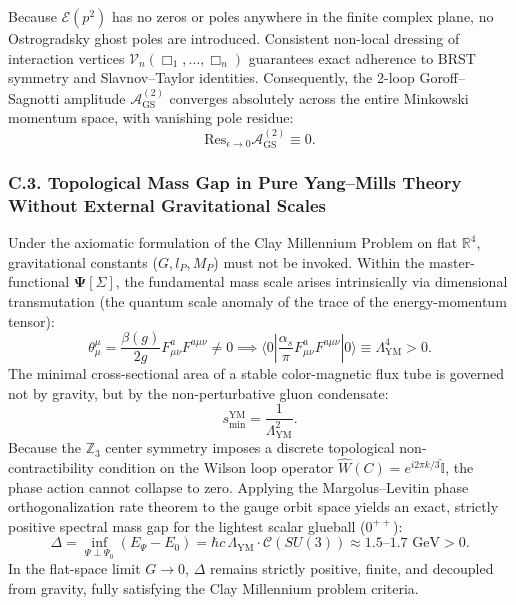 \documentclass[11pt,a4paper]{article}
\theoremstyle{definition}
\begin{document}
Because $\mathcal{E}(p^2)$ has no zeros or poles anywhere in the finite complex plane, no Ostrogradsky ghost poles are introduced. Consistent non-local dressing of interaction vertices $\mathcal{V}_n(\Box_1, \dots, \Box_n)$ guarantees exact adherence to BRST symmetry and Slavnov--Taylor identities. Consequently, the 2-loop Goroff--Sagnotti amplitude $\mathcal{A}_{\text{GS}}^{(2)}$ converges absolutely across the entire Minkowski momentum space, with vanishing pole residue:
\begin{equation}\label{eq:C.6_en}\tag{C.6}
\text{Res}_{\epsilon \to 0} \mathcal{A}_{\text{GS}}^{(2)} \equiv 0.
\end{equation}

\subsubsection*{C.3. Topological Mass Gap in Pure Yang--Mills Theory Without External Gravitational Scales}

Under the axiomatic formulation of the Clay Millennium Problem on flat $\mathbb{R}^4$, gravitational constants ($G, l_P, M_P$) must not be invoked. Within the master-functional $\mathbf{\Psi}[\Sigma]$, the fundamental mass scale arises intrinsically via dimensional transmutation (the quantum scale anomaly of the trace of the energy-momentum tensor):
\begin{equation}\label{eq:C.7_en}\tag{C.7}
\theta^\mu_\mu = \frac{\beta(g)}{2g} F_{\mu\nu}^a F^{a\mu\nu} \neq 0 \implies \langle 0 | \frac{\alpha_s}{\pi} F_{\mu\nu}^a F^{a\mu\nu} | 0 \rangle \equiv \Lambda_{\text{YM}}^4 > 0.
\end{equation}
The minimal cross-sectional area of a stable color-magnetic flux tube is governed not by gravity, but by the non-perturbative gluon condensate:
\begin{equation}\label{eq:C.8_en}\tag{C.8}
s_{\text{min}}^{\text{YM}} = \frac{1}{\Lambda_{\text{YM}}^2}.
\end{equation}
Because the $\mathbb{Z}_3$ center symmetry imposes a discrete topological non-contractibility condition on the Wilson loop operator $\hat{W}(C) = e^{i 2\pi k / 3} \hat{\mathbb{I}}$, the phase action cannot collapse to zero. Applying the Margolus--Levitin phase orthogonalization rate theorem to the gauge orbit space yields an exact, strictly positive spectral mass gap for the lightest scalar glueball ($0^{++}$):
\begin{equation}\label{eq:C.9_en}\tag{C.9}
\Delta = \inf_{\Psi \perp \Psi_0} (E_\Psi - E_0) = \hbar c \, \Lambda_{\text{YM}} \cdot \mathcal{C}(SU(3)) \approx 1.5\text{--}1.7\text{ GeV} > 0.
\end{equation}
In the flat-space limit $G \to 0$, $\Delta$ remains strictly positive, finite, and decoupled from gravity, fully satisfying the Clay Millennium problem criteria.
\end{document}
